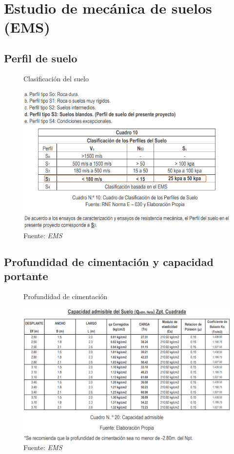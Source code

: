 \documentclass[12pt]{article}
\begin{document}
\section{Estudio de mecánica de suelos (EMS)}

\subsection{Perfil de suelo}

\begin{figure}[h!]
    \centering
    \caption{Clasificación del suelo}
    \includegraphics[scale=0.85]{IMAGENES/1.PNG}
    \caption*{\small Fuente: \it EMS}
    \label{fig:my_label}
\end{figure}

\newpage
\subsection{Profundidad de cimentación y capacidad portante}

\begin{figure}[h!]
    \centering
    \caption{Profundidad de cimentación}
    \includegraphics[scale=0.6]{IMAGENES/2.PNG}
    \caption*{\small Fuente: \it EMS}
    \label{fig:my_label}
\end{figure}
\end{document}
